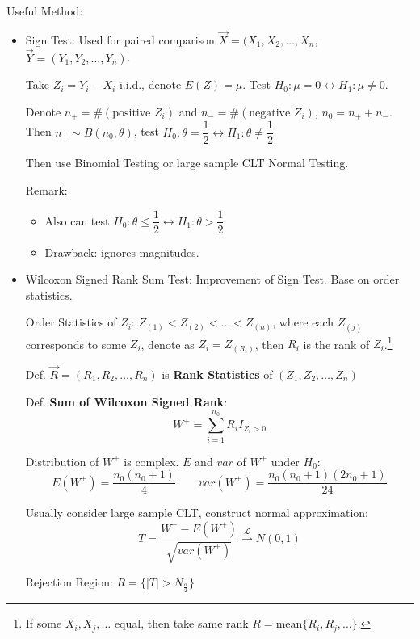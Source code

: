     Useful Method:
    \begin{itemize}
        \item Sign Test: Used for paired comparison $\vec{X}=(X_1,X_2,\ldots,X_n$, $\vec{Y}=(Y_1,Y_2,\ldots,Y_n)$.
        
        Take $Z_i=Y_i-X_i$ i.i.d., denote $E(Z)=\mu$. Test $H_0:\mu=0\longleftrightarrow H_1:\mu\neq 0$.

        Denote $n_+=\#(\text{positive } Z_i)$ and $n_-=\#(\text{negative }Z_i)$, $n_0=n_++n_-$. Then $n_+\sim B(n_0,\theta)$, test $H_0:\theta=\dfrac{1}{2}\longleftrightarrow H_1:\theta\neq\dfrac{1}{2}$
        
        Then use Binomial Testing or large sample CLT Normal Testing.

        Remark:
        \begin{itemize}
            \item Also can test $H_0:\theta\leq\dfrac{1}{2}\longleftrightarrow H_1:\theta>\dfrac{1}{2}$
            \item Drawback: ignores magnitudes.
        \end{itemize}
        
        \item {}Wilcoxon Signed Rank Sum Test: Improvement of Sign Test. Base on order statistics.
        
        Order Statistics of $Z_i$: $Z_{(1)}<Z_{(2)}<\ldots<Z_{(n)}$, where each $Z_{(j)}$ corresponds to some $Z_i$, denote as $Z_i=Z_{(R_i)}$, then $R_i$ is the rank of $Z_i$.\footnote{If some $X_i,X_j,\ldots$ equal, then take same rank $R=\mathrm{mean}\{R_i,R_j,\ldots\}$.}
        
        Def. $\vec{R}=(R_1,R_2,\ldots,R_n)$ is \textbf{Rank Statistics} of $(Z_1,Z_2,\ldots,Z_n)$

        Def. \textbf{Sum of Wilcoxon Signed Rank}: 
        \[
        W^+=\sum_{i=1}^{n_0}R_iI_{Z_i>0} 
        \]

        Distribution of $W^+$ is complex. $E$ and $var$ of $W^+$ under $H_0$:
        \[
        E(W^+)=\frac{n_0(n_0+1)}{4}\qquad var(W^+)=\frac{n_0(n_0+1)(2n_0+1)}{24}    
        \]

        Usually consider large sample CLT, construct normal approximation:
        \[
            T=\frac{W^+-E(W^+)}{\sqrt{var(W^+)}}\xrightarrow[]{\mathscr{L}}N(0,1)
        \]

        Rejection Region: $R=\{|T|>N_\frac{\alpha}{2}\}$


\end{itemize}
